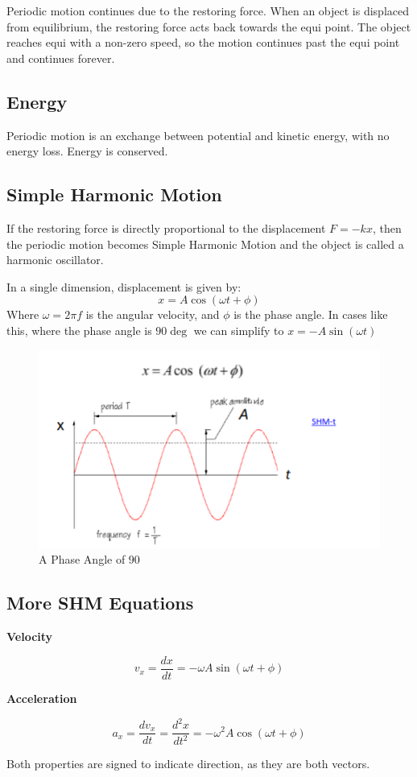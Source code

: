 Periodic motion continues due to the restoring force. When an object is displaced from equilibrium, the restoring force acts back towards the equi point. The object reaches equi with a non-zero speed, so the motion continues past the equi point and continues forever.

\subsection*{Energy}
Periodic motion is an exchange between potential and kinetic energy, with no energy loss. Energy is conserved.

\subsection*{Simple Harmonic Motion}
If the restoring force is directly proportional to the displacement $F = -kx$, then the periodic motion becomes Simple Harmonic Motion and the object is called a harmonic oscillator.

In a single dimension, displacement is given by:
\[
    x = A \cos(\omega t + \phi)
\]
Where $\omega = 2 \pi f$ is the angular velocity, and $\phi$ is the phase angle. In cases like this, where the phase angle is $90 \deg$ we can simplify to $x = -A \sin(\omega t)$
\begin{figure}[H]
    \centering
    \includegraphics{figures/phaseangle.png}
    \caption{A Phase Angle of 90}
\end{figure}

\subsection*{More SHM Equations}
\textbf{Velocity}

\[
    v_x = \frac{dx}{dt} = - \omega A \sin(\omega t + \phi)
\]

\textbf{Acceleration}

\[
    a_x = \frac{d v_x}{dt} = \frac{d^2 x}{dt^2} = - \omega^2 A \cos(\omega t + \phi)
\]

Both properties are signed to indicate direction, as they are both vectors.



